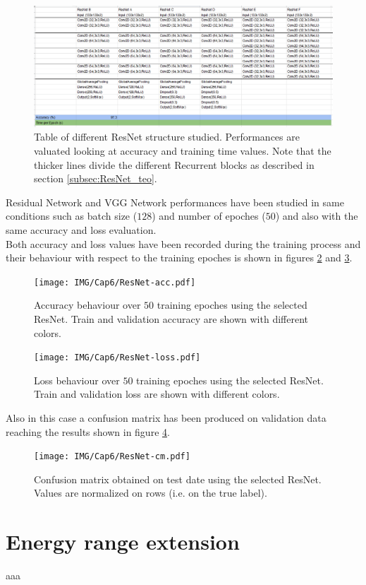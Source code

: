 \begin{figure}
	\centering
	\includegraphics[width=1.\textwidth]{IMG/Cap6/ResNet-Tab.png}
	\caption{Table of different ResNet structure studied. Performances are valuated looking at accuracy and training time values. Note that the thicker lines divide the different Recurrent blocks as described in section \ref{subsec:ResNet_teo}.}
	\label{fig:ResNet-tested}
\end{figure}

Residual Network and VGG Network performances have been studied in same conditions such as batch size ($128$) and number of epoches ($50$) and also with the same accuracy and loss evaluation.\\
Both accuracy and loss values have been recorded during the training process and their behaviour with respect to the training epoches is shown in figures \ref{fig:ResNet-acc} and \ref{fig:ResNet-loss}.

\begin{figure}
	\centering
	\texttt{[image: IMG/Cap6/ResNet-acc.pdf]}
	\caption{Accuracy behaviour over $50$ training epoches using the selected ResNet. Train and validation accuracy are shown with different colors.}
	\label{fig:ResNet-acc}
\end{figure}

\begin{figure}
	\centering
	\texttt{[image: IMG/Cap6/ResNet-loss.pdf]}
	\caption{Loss behaviour over $50$ training epoches using the selected ResNet. Train and validation loss are shown with different colors.}
	\label{fig:ResNet-loss}
\end{figure}

Also in this case a confusion matrix has been produced on validation data reaching the results shown in figure \ref{fig:ResNet-cm}.

\begin{figure}
	\centering
	\texttt{[image: IMG/Cap6/ResNet-cm.pdf]}
	\caption{Confusion matrix obtained on test date  using the selected ResNet. Values are normalized on rows (i.e. on the true label).}
	\label{fig:ResNet-cm}
\end{figure}

\section{Energy range extension}
aaa